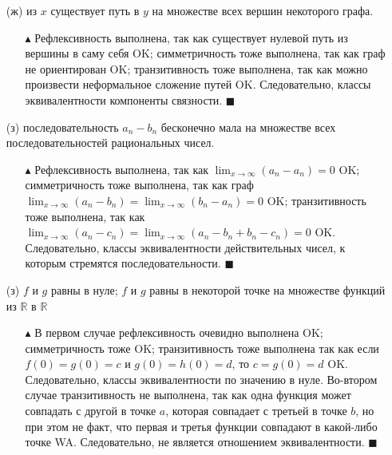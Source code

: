 \begin{enumerate}
    \item[(ж)] из $x$ существует путь в $y$ на множестве всех вершин некоторого графа.
    \begin{itemize}
        \item[$\blacktriangle$] Рефлексивность выполнена, так как существует нулевой путь из вершины в саму себя {\color{ForestGreen}OK}; симметричность тоже выполнена, так как граф не ориентирован {\color{ForestGreen}OK}; транзитивность тоже выполнена, так как можно произвести неформальное сложение путей {\color{ForestGreen}OK}. Следовательно, классы эквивалентности компоненты связности. $\blacksquare$
    \end{itemize}
    
    \item[(з)] последовательность $a_n - b_n$ бесконечно мала на множестве всех последовательностей рациональных чисел.
    \begin{itemize}
        \item[$\blacktriangle$] Рефлексивность выполнена, так как $\lim_{x\to\infty} (a_n-a_n) = 0$ {\color{ForestGreen}OK}; симметричность тоже выполнена, так как граф $\lim_{x\to\infty} (a_n-b_n) = \lim_{x\to\infty} (b_n-a_n) =0$ {\color{ForestGreen}OK}; транзитивность тоже выполнена, так как $\lim_{x\to\infty} (a_n-c_n) = \lim_{x\to\infty} (a_n-b_n+b_n-c_n) =0$ {\color{ForestGreen}OK}. Следовательно, классы эквивалентности действительных чисел, к которым стремятся последовательности. $\blacksquare$
    \end{itemize}
    
    \item[(з)] $f$ и $g$ равны в нуле; $f$ и $g$ равны в некоторой точке на множестве функций из $\mathbb{R}$ в $\mathbb{R}$
    \begin{itemize}
        \item[$\blacktriangle$] В первом случае рефлексивность очевидно выполнена {\color{ForestGreen}OK}; симметричность тоже {\color{ForestGreen}OK}; транзитивность тоже выполнена так как если $f(0)=g(0)=c$ и $g(0)=h(0)=d$, то $c=g(0)=d$ {\color{ForestGreen}OK}. Следовательно, классы эквивалентности по значению в нуле. 
        \newline Во-втором случае транзитивность не выполнена, так как одна функция может совпадать с другой в точке $a$, которая совпадает с третьей в точке $b$, но при этом не факт, что первая и третья функции совпадают в какой-либо точке {\color{Red}WA}. Следовательно, не является отношением эквивалентности. $\blacksquare$
    \end{itemize}
\end{enumerate}
